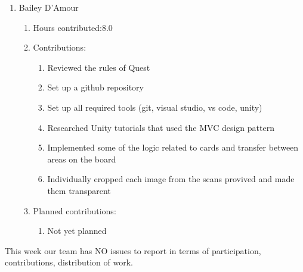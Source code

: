 \documentclass[11pt]{article}
\begin{document}
\begin{enumerate}
\item Bailey D'Amour
\begin{enumerate}
\item Hours contributed:8.0
\item Contributions:
\begin{enumerate}
\item Reviewed the rules of Quest
\item Set up a github repository
\item Set up all required tools (git, visual studio, vs code, unity)
\item Researched Unity tutorials that used the MVC design pattern
\item Implemented some of the logic related to cards and transfer between areas on the board
\item Individually cropped each image from the scans provived and made them transparent
\end{enumerate}
\item Planned contributions:
\begin{enumerate}
\item Not yet planned
\end{enumerate}
\end{enumerate}
\end{enumerate}


This week our team has NO issues to report in terms of participation, contributions, distribution of work.
\end{document}
